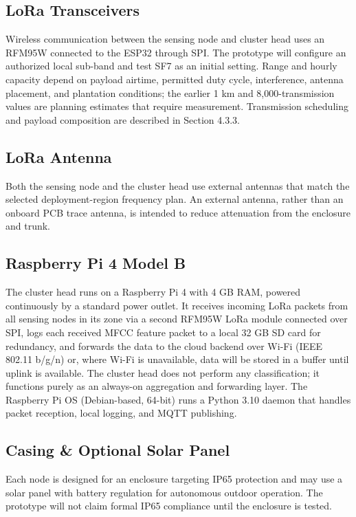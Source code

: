 \documentclass[12pt,a4paper,oneside]{memoir}
\newcommand{\newrevision}[1]{\textcolor{green!45!black}{#1}}
\begin{document}
\subsection{LoRa Transceivers}

Wireless communication between the sensing node and cluster head uses an RFM95W connected to the ESP32 through SPI. The prototype will configure an authorized local sub-band and test SF7 as an initial setting. Range and hourly capacity depend on payload airtime, permitted duty cycle, interference, antenna placement, and plantation conditions; the earlier 1 km and 8,000-transmission values are planning estimates that require measurement. Transmission scheduling and payload composition are described in Section 4.3.3.

\subsection{LoRa Antenna}

\newrevision{Both the sensing node and the cluster head use external antennas that match the selected deployment-region frequency plan. An external antenna, rather than an onboard PCB trace antenna, is intended to reduce attenuation from the enclosure and trunk.}

\subsection{Raspberry Pi 4 Model B}

The cluster head runs on a Raspberry Pi 4 with 4 GB RAM, powered continuously by a standard power outlet. It receives incoming LoRa packets from all sensing nodes in its zone via a second RFM95W LoRa module connected over SPI, logs each received MFCC feature packet to a local 32 GB SD card for redundancy, and forwards the data to the cloud backend over Wi-Fi (IEEE 802.11 b/g/n) or, where Wi-Fi is unavailable, data will be stored in a buffer until uplink is available. The cluster head does not perform any classification; it functions purely as an always-on aggregation and forwarding layer. The Raspberry Pi OS (Debian-based, 64-bit) runs a Python 3.10 daemon that handles packet reception, local logging, and MQTT publishing.

\subsection{Casing \& Optional Solar Panel}

\newrevision{Each node is designed for an enclosure targeting IP65 protection and may use a solar panel with battery regulation for autonomous outdoor operation. The prototype will not claim formal IP65 compliance until the enclosure is tested.}
\end{document}

